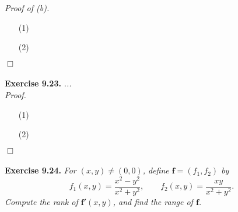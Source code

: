 \documentclass{article}
\begin{document}
\emph{Proof of (b).}
\begin{enumerate}
\item[(1)]
\item[(2)]
\end{enumerate}
$\Box$ \\\\






\textbf{Exercise 9.23.}
\emph{...} \\

\emph{Proof.}
\begin{enumerate}
\item[(1)]
\item[(2)]

\end{enumerate}
$\Box$ \\\\






\textbf{Exercise 9.24.}
\emph{For $(x,y) \neq (0,0)$, define $\mathbf{f} = (f_1,f_2)$ by
\[
  f_1(x,y) = \frac{x^2-y^2}{x^2+y^2},
  \qquad
  f_2(x,y) = \frac{xy}{x^2+y^2}.
\]
Compute the rank of $\mathbf{f}'(x,y)$, and find the range of $\mathbf{f}$.} \\
\end{document}
